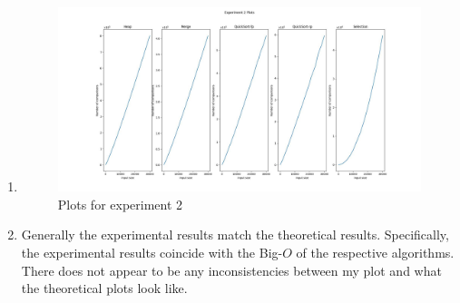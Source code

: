 \documentclass[12pt, a4paper]{article}
\newcommand{\squeezeup}{\vspace{-16pt}}%
\begin{document}
\begin{enumerate}[start=7]
    \squeezeup

    \begin{enumerate}

      \item \begin{figure}[h!]
        \centering
        \includegraphics[width=\textwidth]{"Experiment_2_Plots.jpeg"}
        \caption{Plots for experiment 2}
        \label{fig:1}
        \end{figure}

      \squeezeup

      \item Generally the experimental results match the theoretical results.
      Specifically, the experimental results coincide with the Big-$O$ of the respective algorithms.
      There does not appear to be any inconsistencies between my plot and what the theoretical plots look like.
      
    \end{enumerate}

\end{enumerate}
\end{document}
